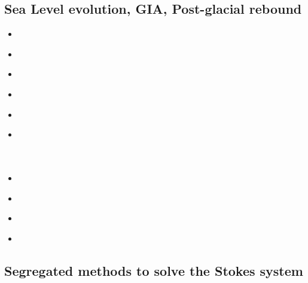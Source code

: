 \subsection{Sea Level evolution, GIA, Post-glacial rebound}

\begin{scriptsize}
\begin{itemize}
\item[\nineteenseventyeight] 
\textcite{pefc78} \\
\item[\twothousandseven] 
\textcite{zhpw03} \\
\item[\twothousandseven] 
\textcite{pazw05} \\
\item[\twothousandseven] 
\textcite{pazw07} \\
\item[\twothousandnine] 
\textcite{cohu09} \\
\item[\twothousandthirteen] 
\textcite{conr13} \\
\textcite{ivjw13} \\
\textcite{awzh13} \\
\item[\twothousandfourteen] 
\textcite{larp14} \\
\item[\twothousandeighteen] 
\textcite{makv18} \\
\item[\twothousandnineteen] 
\textcite{halk19} \\
\item[\twothousandtwentytwo]
\textcite{kaza22} \\
\end{itemize}
\end{scriptsize}

\subsection{Segregated methods to solve the Stokes system}

